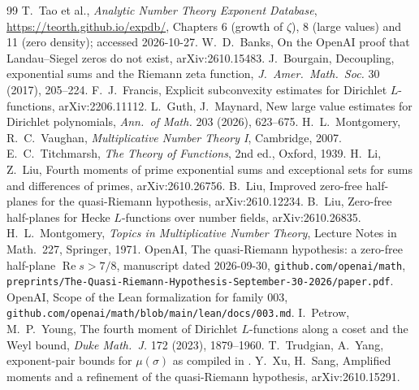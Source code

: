 \documentclass[11pt]{article}
\renewcommand{\Re}{\operatorname{Re}}
\begin{document}
\begin{thebibliography}{99}
 T.~Tao et al., \emph{Analytic Number Theory Exponent Database}, \url{https://teorth.github.io/expdb/}, Chapters 6 (growth of $\zeta$), 8 (large values) and 11 (zero density); accessed 2026-10-27.
 W.~D.~Banks, On the OpenAI proof that Landau--Siegel zeros do not exist, arXiv:2610.15483.
 J.~Bourgain, Decoupling, exponential sums and the Riemann zeta function, \emph{J.\ Amer.\ Math.\ Soc.} 30 (2017), 205--224.
 F.~J.~Francis, Explicit subconvexity estimates for Dirichlet $L$-functions, arXiv:2206.11112.
 L.~Guth, J.~Maynard, New large value estimates for Dirichlet polynomials, \emph{Ann.\ of Math.} 203 (2026), 623--675.
 H.~L.~Montgomery, R.~C.~Vaughan, \emph{Multiplicative Number Theory I}, Cambridge, 2007.
 E.~C.~Titchmarsh, \emph{The Theory of Functions}, 2nd ed., Oxford, 1939.
 H.~Li, Z.~Liu, Fourth moments of prime exponential sums and exceptional sets for sums and differences of primes, arXiv:2610.26756.
 B.~Liu, Improved zero-free half-planes for the quasi-Riemann hypothesis, arXiv:2610.12234.
 B.~Liu, Zero-free half-planes for Hecke $L$-functions over number fields, arXiv:2610.26835.
 H.~L.~Montgomery, \emph{Topics in Multiplicative Number Theory}, Lecture Notes in Math.\ 227, Springer, 1971.
 OpenAI, The quasi-Riemann hypothesis: a zero-free half-plane $\Re s>7/8$, manuscript dated 2026-09-30, \texttt{github.com/openai/math}, \texttt{preprints/The-Quasi-Riemann-Hypothesis-September-30-2026/paper.pdf}.
 OpenAI, Scope of the Lean formalization for family 003, \texttt{github.com/openai/math/blob/main/lean/docs/003.md}.
 I.~Petrow, M.~P.~Young, The fourth moment of Dirichlet $L$-functions along a coset and the Weyl bound, \emph{Duke Math.\ J.} 172 (2023), 1879--1960.
 T.~Trudgian, A.~Yang, exponent-pair bounds for $\mu(\sigma)$ as compiled in \cite[Thm.~6.13, Table~6.2]{ANTEDB}.
 Y.~Xu, H.~Sang, Amplified moments and a refinement of the quasi-Riemann hypothesis, arXiv:2610.15291.
\end{thebibliography}
\end{document}
